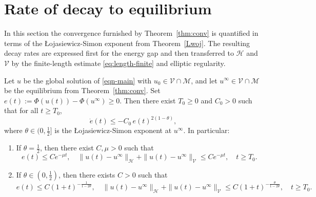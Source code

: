 \documentclass[reqno]{amsart}
\begin{document}
\section{Rate of decay to equilibrium}
In this section the convergence furnished by Theorem~\ref{thm:conv} is quantified in
terms of the \L{o}jasiewicz-Simon exponent from Theorem~\ref{Lwoj}.
The resulting decay rates are expressed first
for the energy gap and then transferred to $\mathcal H$ and $\mathcal V$ by the
finite-length
estimate \eqref{eq:length-finite} and elliptic regularity.

\begin{theorem}\label{thm:rates}
Let $u$ be the global solution of \eqref{eqn-main} with $u_0\in\mathcal V\cap\mathcal M$,
and let $u^\infty\in\mathcal V\cap\mathcal M$ be the equilibrium from
Theorem~\ref{thm:conv}. Set
$e(t):=\Phi(u(t))-\Phi(u^\infty)\ge 0$. Then there exist $T_0\ge 0$ and $C_0>0$ such that for all
$t\ge T_0$,
\begin{equation}\label{eq:gap-ode-final}
\dot e(t)\le -C_0\,e(t)^{2(1-\theta)},
\end{equation}
where $\theta\in(0,\tfrac12]$ is the \L{o}jasiewicz-Simon exponent at $u^\infty$. In particular:
\begin{enumerate}
\item[(i)] If $\theta=\tfrac12$, then there exist $C,\mu>0$ such that
\[
e(t)\le C e^{-\mu t},\quad
\|u(t)-u^\infty\|_{\mathcal H}+\|u(t)-u^\infty\|_{\mathcal V}\le C e^{-\mu t},
\quad t\ge T_0.
\]
\item[(ii)] If $\theta\in(0,\tfrac12)$, then there exists $C>0$ such that
\[
e(t)\le C(1+t)^{-\frac{1}{1-2\theta}},\quad
\|u(t)-u^\infty\|_{\mathcal H}+\|u(t)-u^\infty\|_{\mathcal V}\le
C(1+t)^{-\frac{\theta}{1-2\theta}},
\quad t\ge T_0.
\]
\end{enumerate}
\end{theorem}
\end{document}
